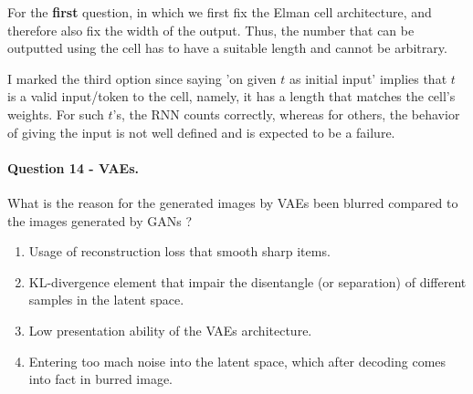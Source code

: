 \documentclass{article}
\begin{document}
For the \textbf{first} question, in which we first fix the Elman cell architecture, and therefore also fix the width of the output. Thus, the number that can be outputted using the cell has to have a suitable length and cannot be arbitrary.

I marked the third option since saying 'on given $t$ as initial input' implies that $t$ is a valid input/token to the cell, namely, it has a length that matches the cell's weights. For such $t$'s, the RNN counts correctly, whereas for others, the behavior of giving the input is not well defined and is expected to be a failure.


\paragraph{ Question 14 - VAEs. } What is the reason for the generated images by VAEs been blurred compared to the images generated by GANs ?   
\begin{enumerate}
  \item Usage of reconstruction loss that smooth sharp items.   
  \item  KL-divergence element that impair the disentangle (or separation) of different samples in the latent space. 
  \item Low presentation ability of the VAEs architecture. 
  \item Entering too mach noise into the latent space, which after decoding comes into fact in burred image. 

\end{enumerate}
\end{document}
